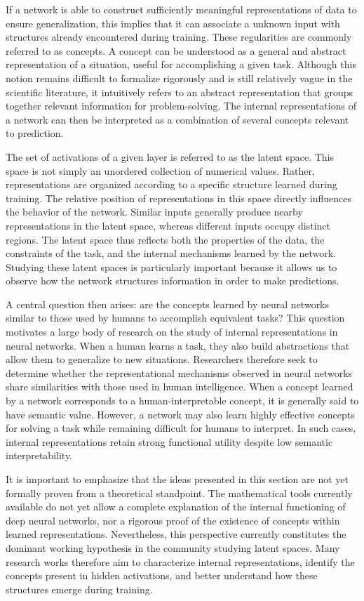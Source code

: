 If a network is able to construct sufficiently meaningful representations of data to ensure generalization, this implies that it can associate a unknown input with structures already encountered during training.
These regularities are commonly referred to as concepts.
A concept can be understood as a general and abstract representation of a situation, useful for accomplishing a given task.
Although this notion remains difficult to formalize rigorously and is still relatively vague in the scientific literature, it intuitively refers to an abstract representation that groups together relevant information for problem-solving.
The internal representations of a network can then be interpreted as a combination of several concepts relevant to prediction.

The set of activations of a given layer is referred to as the latent space.
This space is not simply an unordered collection of numerical values.
Rather, representations are organized according to a specific structure learned during training.
The relative position of representations in this space directly influences the behavior of the network.
Similar inputs generally produce nearby representations in the latent space, whereas different inputs occupy distinct regions.
The latent space thus reflects both the properties of the data, the constraints of the task, and the internal mechanisms learned by the network.
Studying these latent spaces is particularly important because it allows us to observe how the network structures information in order to make predictions.

A central question then arises: are the concepts learned by neural networks similar to those used by humans to accomplish equivalent tasks?
This question motivates a large body of research on the study of internal representations in neural networks.
When a human learns a task, they also build abstractions that allow them to generalize to new situations.
Researchers therefore seek to determine whether the representational mechanisms observed in neural networks share similarities with those used in human intelligence.
When a concept learned by a network corresponds to a human-interpretable concept, it is generally said to have semantic value.
However, a network may also learn highly effective concepts for solving a task while remaining difficult for humans to interpret.
In such cases, internal representations retain strong functional utility despite low semantic interpretability.

It is important to emphasize that the ideas presented in this section are not yet formally proven from a theoretical standpoint.
The mathematical tools currently available do not yet allow a complete explanation of the internal functioning of deep neural networks, nor a rigorous proof of the existence of concepts within learned representations.
Nevertheless, this perspective currently constitutes the dominant working hypothesis in the community studying latent spaces.
Many research works therefore aim to characterize internal representations, identify the concepts present in hidden activations, and better understand how these structures emerge during training.